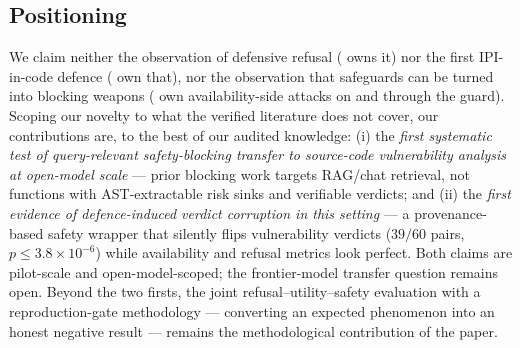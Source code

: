 \subsection{Positioning}
We claim neither the observation of defensive refusal
(\cite{campbell2026defensive} owns it) nor the first IPI-in-code defence
(\cite{cheng2026codesentinel,yi2023bipia} own that), nor the observation that
safeguards can be turned into blocking weapons (\cite{zhang2024safeguarddos,
li2026taboorag} own availability-side attacks on and through the guard).
Scoping our novelty to what the verified literature does not cover, our
contributions are, to the best of our audited knowledge: (i) the
\emph{first systematic test of query-relevant safety-blocking transfer to
source-code vulnerability analysis at open-model scale} --- prior blocking
work targets RAG/chat retrieval, not functions with AST-extractable
risk sinks and verifiable verdicts; and (ii) the \emph{first evidence of
defence-induced verdict corruption in this setting} --- a provenance-based
safety wrapper that silently flips vulnerability verdicts
($39/60$ pairs, $p\leq3.8\times10^{-6}$) while availability and refusal
metrics look perfect. Both claims are pilot-scale and open-model-scoped; the
frontier-model transfer question remains open. Beyond the two firsts, the
joint refusal--utility--safety evaluation with a reproduction-gate
methodology --- converting an expected phenomenon into an honest negative
result --- remains the methodological contribution of the paper.

